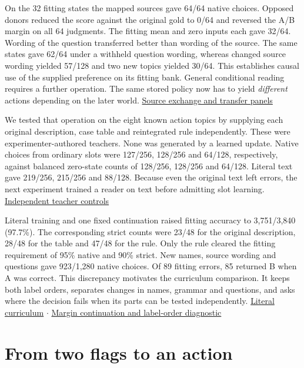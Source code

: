 \documentclass[11pt]{article}
\begin{document}
On the 32 fitting states the mapped sources gave 64/64 native choices. Opposed donors reduced the score against the original gold to 0/64 and reversed the A/B margin on all 64 judgments. The fitting mean and zero inputs each gave 32/64. Wording of the question transferred better than wording of the source. The same states gave 62/64 under a withheld question wording, whereas changed source wording yielded 57/128 and two new topics yielded 30/64. This establishes causal use of the supplied preference on its fitting bank. General conditional reading requires a further operation. The same stored policy now has to yield \emph{different} actions depending on the later world. \href{https://github.com/RyoSpiralArchitect/self-fold/blob/v1.0.0/provenance/source_lexical_20261103/RESULTS.md}{Source exchange and transfer panels}

We tested that operation on the eight known action topics by supplying each original description, case table and reintegrated rule independently. These were experimenter-authored teachers. None was generated by a learned update. Native choices from ordinary slots were 127/256, 128/256 and 64/128, respectively, against balanced zero-state counts of 128/256, 128/256 and 64/128. Literal text gave 219/256, 215/256 and 88/128. Because even the original text left errors, the next experiment trained a reader on text before admitting slot learning. \href{https://github.com/RyoSpiralArchitect/self-fold/blob/v1.0.0/provenance/action_operation_20261103/RESULTS.md}{Independent teacher controls}

Literal training and one fixed continuation raised fitting accuracy to 3,751/3,840 (97.7\%). The corresponding strict counts were 23/48 for the original description, 28/48 for the table and 47/48 for the rule. Only the rule cleared the fitting requirement of 95\% native and 90\% strict. New names, source wording and questions gave 923/1,280 native choices. Of 89 fitting errors, 85 returned B when A was correct. This discrepancy motivates the curriculum comparison. It keeps both label orders, separates changes in names, grammar and questions, and asks where the decision fails when its parts can be tested independently. \href{https://github.com/RyoSpiralArchitect/self-fold/blob/v1.0.0/provenance/conditional_curriculum_20261103/RESULTS.md}{Literal curriculum} $\cdot$ \href{https://github.com/RyoSpiralArchitect/self-fold/blob/v1.0.0/provenance/conditional_margin_20261103/RESULTS.md}{Margin continuation and label-order diagnostic}

\section{From two flags to an action}
\end{document}
